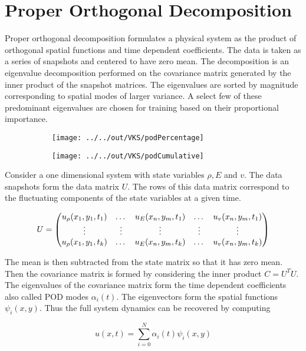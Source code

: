 \documentclass[]{type}
\begin{document}
\section{Proper Orthogonal Decomposition}


Proper orthogonal decomposition formulates a physical system as the product of orthogonal spatial functions 
and time dependent coefficients.
The data is taken as a series of snapshots 
and centered to have zero mean.
The decomposition is an eigenvalue decomposition performed on the covariance matrix
generated by the inner product of the snapshot matrices.
The eigenvalues are sorted by magnitude corresponding to spatial modes of larger variance.
A select few of these predominant eigenvalues are chosen for training based on their proportional importance.

\begin{figure}[H]
	\centering
	\begin{subfigure}{.45\textwidth}
	\texttt{[image: ../../out/VKS/podPercentage]}
	\end{subfigure}
	\begin{subfigure}{.45\textwidth}
	\texttt{[image: ../../out/VKS/podCumulative]}
	\end{subfigure}
	\label{fig:f1}
\end{figure}

Consider a one dimensional system with state variables $\rho, E$ and $v$.
The data snapshots form the data matrix $U$.
The rows of this data matrix correspond to the fluctuating components
of the state variables at a given time.

$$U = \begin{pmatrix} u_{\rho}(x_1,y_1,t_1) & \dots & u_{E}(x_n,y_m,t_1)& \dots & u_{v}(x_n,y_m,t_1)  \\
		\vdots & \vdots & \vdots& \vdots & \vdots\\
		u_{\rho}(x_1,y_1,t_k) & \dots & u_{E}(x_n,y_m,t_k) & \dots & u_{v}(x_n,y_m,t_k) \end{pmatrix}$$


The mean is then subtracted from the state matrix so that it has zero mean.
Then the covariance matrix is formed by considering the inner product $C = U^T U$.
The eigenvalues of the covariance matrix form the time dependent coefficients also called POD modes $\alpha_i(t)$.
The eigenvectors form the spatial functions $\psi_i(x,y)$.
Thus the full system dynamics can be recovered by computing

$$u(x,t)= \sum_{i=0}^N \alpha_i(t)\psi_i(x,y)$$
\end{document}
